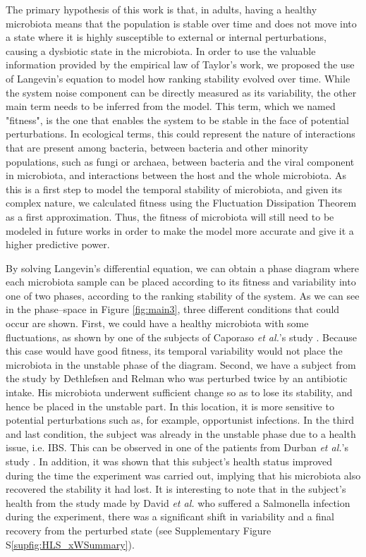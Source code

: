 The primary hypothesis of this work is that, in adults, having a healthy microbiota means that the population is stable over time and does not move into a state where it is highly susceptible to external or internal perturbations, causing a dysbiotic state in the microbiota. In order to use the valuable information provided by the empirical law of Taylor's work, we proposed the use of Langevin's equation to model how ranking stability evolved over time. While the system noise component can be directly measured as its variability, the other main term needs to be inferred from the model. This term, which we named "fitness", is the one that enables the system to be stable in the face of potential perturbations. In ecological terms, this could represent the nature of interactions that are present among bacteria, between bacteria and other minority populations, such as fungi or archaea, between bacteria and the viral component in microbiota, and interactions between the host and the whole microbiota. As this is a first step to model the temporal stability of microbiota, and given its complex nature, we calculated fitness using the Fluctuation Dissipation Theorem as a first approximation\cite{FD}. Thus, the fitness of microbiota will still need to be modeled in future works in order to make the model more accurate and give it a higher predictive power. 

By solving Langevin's differential equation, we can obtain a phase diagram where each microbiota sample can be placed according to its fitness and variability into one of two phases, according to the ranking stability of the system. As we can see in the phase--space in Figure \ref{fig:main3}, three different conditions that could occur are shown. First, we could have a healthy microbiota with some fluctuations, as shown by one of the subjects of Caporaso \emph{et al.}'s study \cite{moving}. Because this case would have good fitness, its temporal variability would not place the microbiota in the unstable phase of the diagram. Second, we have a subject from the study by Dethlefsen and Relman \cite{antibiotic} who was perturbed twice by an antibiotic intake. His microbiota underwent sufficient change so as to lose its stability, and hence be placed in the unstable part. In this location, it is more sensitive to potential perturbations such as, for example, opportunist infections. In the third and last condition, the subject was already in the unstable phase due to a health issue, i.e. IBS. This can be observed in one of the patients from Durban \emph{et al.}'s study \cite{IBS}. In addition, it was shown that this subject's health status improved during the time the experiment was carried out, implying that his microbiota also recovered the stability it had lost. It is interesting to note that in the subject's health from the study made by David \emph{et al.} \cite{hostlife} who suffered a Salmonella infection during the experiment, there was a significant shift in variability and a final recovery from the perturbed state (see Supplementary Figure S\ref{supfig:HLS_xWSummary}).

